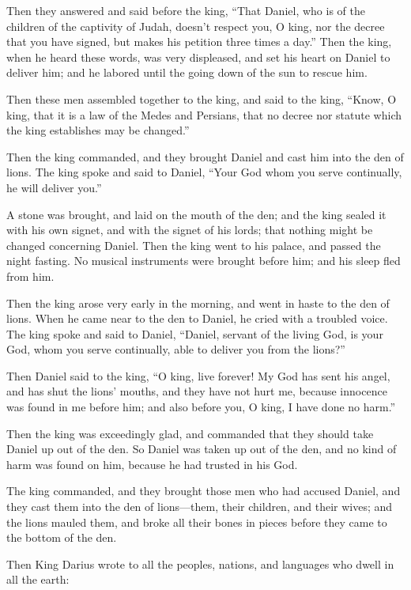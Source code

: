 \myverse{}Then they answered and said before the king, “That Daniel, who
is of the children of the captivity of Judah, doesn’t respect you, O king, nor the decree that you have
signed, but makes his petition three times a day.”
\myverse{}Then the king, when he heard these words, was very displeased, and set his
heart on Daniel to deliver him; and he labored until the going down of the sun to rescue him.

\myverse{}Then these men assembled together to the king, and said to the
king, “Know, O king, that it is a law of the Medes and Persians, that no decree nor statute which the
king establishes may be changed.”

\myverse{}Then the king commanded, and they brought Daniel and cast him
into the den of lions. The king spoke and said to Daniel, “Your God whom you serve continually, he will
deliver you.”

\myverse{}A stone was brought, and laid on the mouth of the den; and the
king sealed it with his own signet, and with the signet of his lords; that nothing might be changed concerning
Daniel.
\myverse{}Then the king went to his palace, and passed the night fasting. No musical
instruments were brought before him; and his sleep fled from him.

\myverse{}Then the king arose very early in the morning, and went in haste
to the den of lions.
\myverse{}When he came near to the den to Daniel, he cried with a troubled voice. The
king spoke and said to Daniel, “Daniel, servant of the living God, is your God, whom you serve continually,
able to deliver you from the lions?”

\myverse{}Then Daniel said to the king, “O king, live forever!
\myverse{}My God has sent his angel, and has shut the lions’ mouths, and they have not
hurt me, because innocence was found in me before him; and also before you, O king, I have done no harm.”

\myverse{}Then the king was exceedingly glad, and commanded that they should
take Daniel up out of the den. So Daniel was taken up out of the den, and no kind of harm was found on
him, because he had trusted in his God.

\myverse{}The king commanded, and they brought those men who had accused
Daniel, and they cast them into the den of lions—them, their children, and their wives; and the lions
mauled them, and broke all their bones in pieces before they came to the bottom of the den.

\myverse{}Then King Darius wrote to all the peoples, nations, and languages
who dwell in all the earth:

